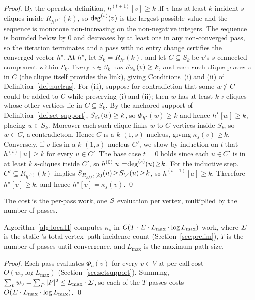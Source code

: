 \begin{proof}
By the operator definition, $h^{(t+1)}[v]\!\ge\!k$ iff $v$ has at least $k$ incident $s$-cliques inside $R_{h^{(t)}}(k)$, so $\deg^{(s)}(v)$ is the largest possible value and the sequence is monotone non-increasing on the non-negative integers.
%
The sequence is bounded below by $0$ and decreases by at least one in any non-converged pass, so the iteration terminates and a pass with no entry change certifies the converged vector $h^\star$.
%
At $h^\star$, let $S_k=R_{h^\star}(k)$, and let $C\subseteq S_k$ be $v$'s $s$-connected component within $S_k$.
%
Every $v\!\in\!S_k$ has $S_{S_k}(v)\ge k$, and each such clique places $v$ in $C$ (the clique itself provides the link), giving Conditions~(i) and (ii) of Definition~\ref{def:nucleus}.
%
For (iii), suppose for contradiction that some $w\!\notin\!C$ could be added to $C$ while preserving (i) and (ii); then $w$ has at least $k$ $s$-cliques whose other vertices lie in $C\subseteq S_k$.
%
By the anchored support of Definition~\ref{def:set-support}, $S_{S_k}(w)\ge k$, so $\Phi_{h^\star}(w)\ge k$ and hence $h^\star[w]\ge k$, placing $w\in S_k$.
%
Moreover each such clique links $w$ to $C$-vertices inside $S_k$, so $w\in C$, a contradiction.
%
Hence $C$ is a $k$-$(1,s)$-nucleus, giving $\kappa_s(v)\!\ge\!k$.
%
Conversely, if $v$ lies in a $k$-$(1,s)$-nucleus $C'$, we show by induction on $t$ that $h^{(t)}[u]\!\ge\!k$ for every $u\!\in\!C'$.
%
The base case $t\!=\!0$ holds since each $u\!\in\!C'$ is in at least $k$ $s$-cliques inside $C'$, so $h^{(0)}[u]\!=\!\deg^{(s)}(u)\!\ge\!k$.
%
For the inductive step, $C'\subseteq R_{h^{(t)}}(k)$ implies $S_{R_{h^{(t)}}(k)}(u)\!\ge\!S_{C'}(u)\!\ge\!k$, so $h^{(t+1)}[u]\!\ge\!k$.
%
Therefore $h^\star[v]\!\ge\!k$, and hence $h^\star[v]=\kappa_s(v)$.
%
\qed
\end{proof}

The cost is the per-pass work, one $S$ evaluation per vertex, multiplied by the number of passes.

\begin{theorem}\label{thm:localh-complexity}
Algorithm~\ref{alg:localH} computes $\kappa_s$ in $O(T\cdot\varSigma\cdot L_{\max}\cdot\log L_{\max})$ work, where $\varSigma$ is the static \cpi{}'s total vertex--path incidence count (Section~\ref{sec:prelim}), $T$ is the number of passes until convergence, and $L_{\max}$ is the maximum path size.
\end{theorem}

\begin{proof}
Each pass evaluates $\Phi_h(v)$ for every $v\in V$ at per-call cost $O(w_v\log L_{\max})$ (Section~\ref{sec:setsupport}).
%
Summing, $\sum_v w_v=\sum_{\TPath}|\TPath|^2\le L_{\max}\cdot\Sig$, so each of the $T$ passes costs $O(\varSigma\cdot L_{\max}\cdot\log L_{\max})$.
%
\qed
\end{proof}


